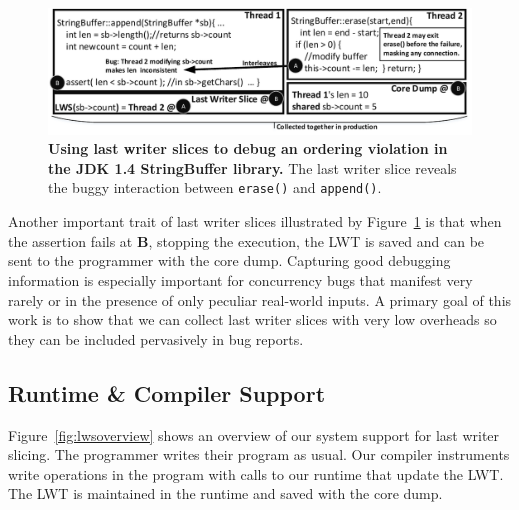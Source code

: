 \documentclass[pageno,nohyperref]{jpaper}
\newcommand{\lwt}{LWT\xspace}
\newcommand{\Caption}[1]{\begin{minipage}{.95\columnwidth} \caption{#1} \end{minipage} \vspace{-1.2ex}}
\begin{document}


\begin{figure}[h]
\centering
\includegraphics[width=\columnwidth]{figs/JDKStringBufferDebug2.pdf}
\Caption{\label{fig:jdklws}{\bf Using last writer slices to debug an
ordering violation in the JDK 1.4 StringBuffer library.} The last writer slice reveals the buggy interaction between {\tt erase()} and {\tt append()}.}
\end{figure}


Another important trait of last writer slices illustrated by
Figure~\ref{fig:jdklws} is that when the assertion fails at {\bf B}, stopping
the execution, the \lwt is saved and can be sent to the programmer with the
core dump.  Capturing good debugging information is especially important for
concurrency bugs that manifest very rarely or in the presence of only peculiar
real-world inputs.  A primary goal of this work is to show that we can collect
last writer slices with very low overheads so they can be included pervasively
in bug reports.


\subsection{Runtime \& Compiler Support}

Figure~\ref{fig:lwsoverview} shows an overview of our system support for last
writer slicing.  The programmer writes their program as usual. Our compiler
instruments write operations in the program with calls to our runtime that
update the \lwt.  The \lwt is maintained in the runtime and saved with the core dump. 
\end{document}
